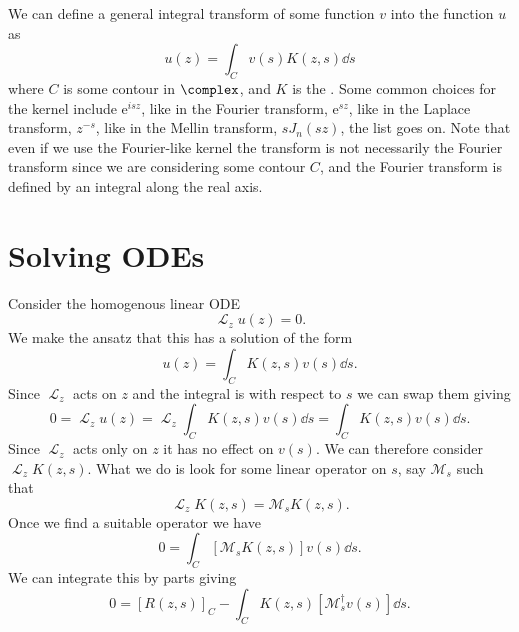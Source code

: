 \documentclass[fleqn]{NotesClass}
\newcommand*{\e}{\mathrm{e}}
\DeclareMathOperator{\linop}{\mathcal{L}}
\newcommand*{\hermit}{\dagger}
\begin{document}
    We can define a general integral transform of some function \(v\) into the function \(u\) as
    \begin{equation}
        u(z) = \int_{C} v(s) K(z, s) \dd{s}
    \end{equation}
    where \(C\) is some contour in \(\complex\), and \(K\) is the .
    Some common choices for the kernel include \(\e^{isz}\), like in the Fourier transform, \(\e^{sz}\), like in the Laplace transform, \(z^{-s}\), like in the Mellin transform, \(sJ_n(sz)\), the list goes on.
    Note that even if we use the Fourier-like kernel the transform is not necessarily the Fourier transform since we are considering some contour \(C\), and the Fourier transform is defined by an integral along the real axis.
    
    \section{Solving ODEs}
    Consider the homogenous linear ODE
    \begin{equation}
        \linop_{z}u(z) = 0.
    \end{equation}
    We make the ansatz that this has a solution of the form
    \begin{equation}
        u(z) = \int_C K(z, s) v(s) \dd{s}.
    \end{equation}
    Since \(\linop_z\) acts on \(z\) and the integral is with respect to \(s\) we can swap them giving
    \begin{equation}
        0 = \linop_{z}u(z) = \linop_{z} \int_C K(z, s) v(s) \dd{s} = \int_C K(z, s) v(s) \dd{s}.
    \end{equation}
    Since \(\linop_z\) acts only on \(z\) it has no effect on \(v(s)\).
    We can therefore consider \(\linop_z K(z, s)\).
    What we do is look for some linear operator on \(s\), say \(\mathcal{M}_s\) such that
    \begin{equation}
        \linop_{z}K(z, s) = \mathcal{M}_sK(z, s).
    \end{equation}
    Once we find a suitable operator we have
    \begin{equation}
        0 = \int_{C} [\mathcal{M}_sK(z, s)]v(s)\dd{s}.
    \end{equation}
    We can integrate this by parts giving
    \begin{equation}\label{eqn:laplace method goal}
        0 = [R(z, s)]_{C} - \int_C K(z, s)[\mathcal{M}_s^\hermit v(s)] \dd{s}.
    \end{equation}
\end{document}
